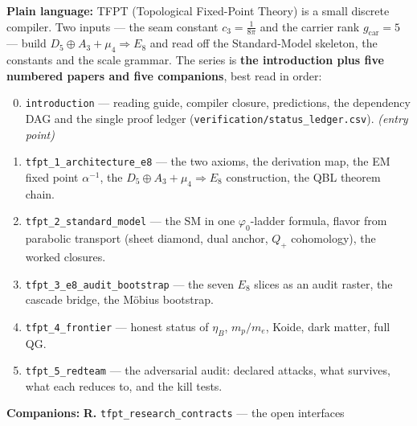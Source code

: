 \begin{navbox}
\textbf{Plain language:} TFPT (Topological Fixed-Point Theory) is a small discrete compiler. Two
inputs --- the seam constant $c_3=\tfrac1{8\pi}$ and the carrier rank $g_{\mathrm{car}}=5$ --- build
$D_5\oplus A_3+\mu_4\Rightarrow E_8$ and read off the Standard-Model skeleton, the constants and the
scale grammar. The series is \textbf{the introduction plus five numbered papers and five companions},
best read in order:
\begin{enumerate}[leftmargin=2.0em,itemsep=1pt,label=\textbf{\arabic*.}]
\setcounter{enumi}{-1}
\item \texttt{introduction} --- reading guide, compiler closure, predictions, the dependency DAG and the
      single proof ledger (\texttt{verification/status\_ledger.csv}). \emph{(entry point)}
\item \texttt{tfpt\_1\_architecture\_e8} --- the two axioms, the derivation map, the EM fixed point
      $\alpha^{-1}$, the $D_5\oplus A_3+\mu_4\Rightarrow E_8$ construction, the QBL theorem chain.
\item \texttt{tfpt\_2\_standard\_model} --- the SM in one $\varphi_0$-ladder formula, flavor from
      parabolic transport (sheet diamond, dual anchor, $Q_+$ cohomology), the worked closures.
\item \texttt{tfpt\_3\_e8\_audit\_bootstrap} --- the seven $E_8$ slices as an audit raster, the cascade
      bridge, the M\"obius bootstrap.
\item \texttt{tfpt\_4\_frontier} --- honest status of $\eta_B$, $m_p/m_e$, Koide, dark matter, full QG.
\item \texttt{tfpt\_5\_redteam} --- the adversarial audit: declared attacks, what survives, what each
      reduces to, and the kill tests.
\end{enumerate}
\noindent\textbf{Companions:} \textbf{R.} \texttt{tfpt\_research\_contracts} --- the open interfaces

\end{navbox}
